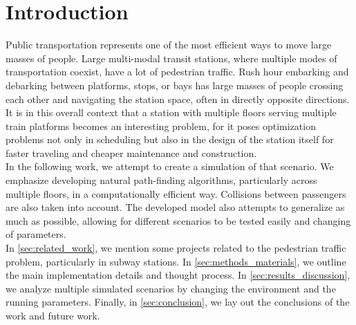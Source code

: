 \section{Introduction} \label{sec:introduction}



Public transportation represents one of the most efficient ways to move large masses of people. Large multi-modal transit stations, where multiple modes of transportation coexist, have a lot of pedestrian traffic. Rush hour embarking and debarking between platforms, stops, or bays has large masses of people crossing each other and navigating the station space, often in directly opposite directions. It is in this overall context that a station with multiple floors serving multiple train platforms becomes an interesting problem, for it poses optimization problems not only in scheduling but also in the design of the station itself for faster traveling and cheaper maintenance and construction. \\
In the following work, we attempt to create a simulation of that scenario. We emphasize developing natural path-finding algorithms, particularly across multiple floors, in a computationally efficient way. Collisions between passengers are also taken into account. The developed model also attempts to generalize as much as possible, allowing for different scenarios to be tested easily and changing of parameters. \\

In \autoref{sec:related_work}, we mention some projects related to the pedestrian traffic problem, particularly in subway stations. In \autoref{sec:methods_materials}, we outline the main implementation details and thought process. In \autoref{sec:results_discussion}, we analyze multiple simulated scenarios by changing the environment and the running parameters. Finally, in \autoref{sec:conclusion}, we lay out the conclusions of the work and future work.
